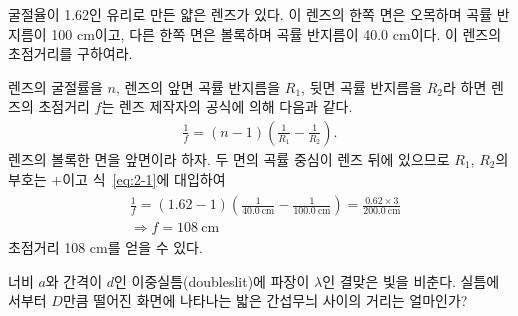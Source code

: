 \documentclass[tightenlines,floatfix,nofootinbib,superscriptaddress,fleqn]{revtex4}
\begin{document}
굴절율이 1.62인 유리로 만든 얇은 렌즈가 있다. 이 렌즈의 한쪽 면은
오목하며 곡률 반지름이 100 cm이고, 다른 한쪽 면은 볼록하며
곡률 반지름이 40.0 cm이다. 이 렌즈의 초점거리를 구하여라. 

렌즈의 굴절률을 $n$, 렌즈의 앞면 곡률 반지름을 $R_1$, 뒷면 곡률 반지름을 $R_2$라
하면 렌즈의 초점거리 $f$는 렌즈 제작자의 공식에 의해 다음과 같다.
\begin{align}\label{eq:2-1}
  \frac{1}{f} = (n-1)\left(\frac{1}{R_1}-\frac{1}{R_2}\right).
\end{align}
렌즈의 볼록한 면을 앞면이라 하자. 두 면의 곡률 중심이 렌즈 뒤에 있으므로 
$R_1$, $R_2$의 부호는 $+$이고 식~\eqref{eq:2-1}에 대입하여
\begin{align}
  \begin{split}
    &\frac{1}{f}=(1.62-1)\left(\frac{1}{40.0~\mathrm{cm}}
    -\frac{1}{100.0~\mathrm{cm}}\right)
    =\frac{0.62\times3}{200.0~\mathrm{cm}}\\ &\Longrightarrow
    f=108~\mathrm{cm}
  \end{split}
\end{align}
초점거리 108 cm를 얻을 수 있다.


\vspace{1cm}

너비 $a$와 간격이 $d$인 이중실틈(doubleslit)에 파장이 $\lambda$인
결맞은 빛을 비춘다. 실틈에서부터 $D$만큼 떨어진 화면에 나타나는 밟은
간섭무늬 사이의 거리는 얼마인가?
\end{document}
